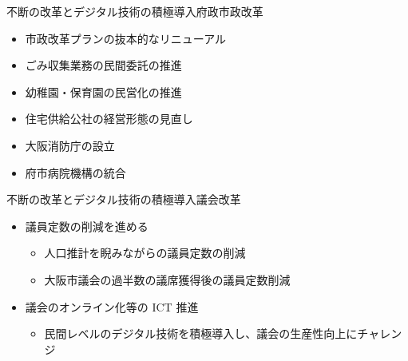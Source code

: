 \documentclass[dvipdfmx]{beamer}
\begin{document}
    \begin{frame}{不断の改革とデジタル技術の積極導入}{府政市政改革}
        \begin{small}
            \begin{itemize}
                \setlength{\itemsep}{2mm}
                \item 市政改革プランの抜本的なリニューアル
                \item ごみ収集業務の民間委託の推進
                \item 幼稚園・保育園の民営化の推進
                \item 住宅供給公社の経営形態の見直し
                \item 大阪消防庁の設立
                \item 府市病院機構の統合
            \end{itemize}
        \end{small}
    \end{frame}

    \begin{frame}{不断の改革とデジタル技術の積極導入}{議会改革}
        \begin{small}
            \begin{itemize}
                \setlength{\itemsep}{5mm}
                \item 議員定数の削減を進める
                \begin{itemize}
                    \setlength{\itemsep}{2mm}
                    \item \alert{人口推計を睨みながらの議員定数の削減}
                    \item \alert{大阪市議会の過半数の議席獲得後の議員定数削減}
                \end{itemize}
                \item 議会のオンライン化等の ICT 推進
                \begin{itemize}
                    \setlength{\itemsep}{2mm}
                    \item 民間レベルのデジタル技術を積極導入し、議会の生産性向上にチャレンジ
                \end{itemize}
            \end{itemize}
        \end{small}
    \end{frame}
\end{document}
